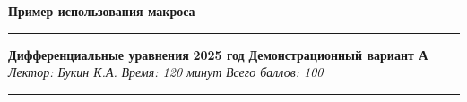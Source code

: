 \documentclass[12pt]{article}
\begin{document}

\newcommand{\examinfopanel}[4]{%
\vspace{0.5em}
\noindent\rule{\textwidth}{0.4pt}
\vspace{0.3em}
\noindent\textbf{Дифференциальные уравнения} \hfill \textbf{#1 год} \hfill \textbf{#2}\\
\noindent\textit{Лектор: Букин К.А.} \hfill \textit{Время: #3} \hfill \textit{Всего баллов: #4}
\vspace{0.3em}
\noindent\rule{\textwidth}{0.4pt}
\vspace{0.5em}
}


\begin{center}
\textbf{Пример использования макроса}
\end{center}

\examinfopanel{2025}{Демонстрационный вариант А}{120 минут}{100}
\end{document}
